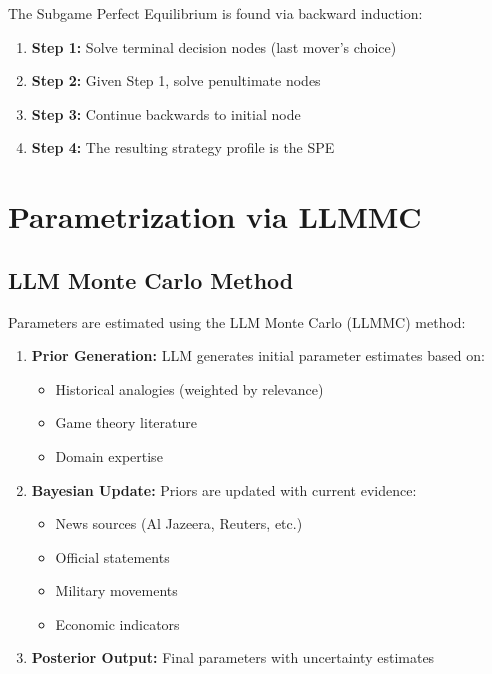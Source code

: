 The Subgame Perfect Equilibrium is found via backward induction:

\begin{enumerate}
\item \textbf{Step 1:} Solve terminal decision nodes (last mover's choice)
\item \textbf{Step 2:} Given Step 1, solve penultimate nodes
\item \textbf{Step 3:} Continue backwards to initial node
\item \textbf{Step 4:} The resulting strategy profile is the SPE
\end{enumerate}



\section{Parametrization via LLMMC}
\label{sec:crisis-params}

\subsection{LLM Monte Carlo Method}

Parameters are estimated using the LLM Monte Carlo (LLMMC) method:

\begin{enumerate}
\item \textbf{Prior Generation:} LLM generates initial parameter estimates based on:
    \begin{itemize}
    \item Historical analogies (weighted by relevance)
    \item Game theory literature
    \item Domain expertise
    \end{itemize}
\item \textbf{Bayesian Update:} Priors are updated with current evidence:
    \begin{itemize}
    \item News sources (Al Jazeera, Reuters, etc.)
    \item Official statements
    \item Military movements
    \item Economic indicators
    \end{itemize}
\item \textbf{Posterior Output:} Final parameters with uncertainty estimates
\end{enumerate}

